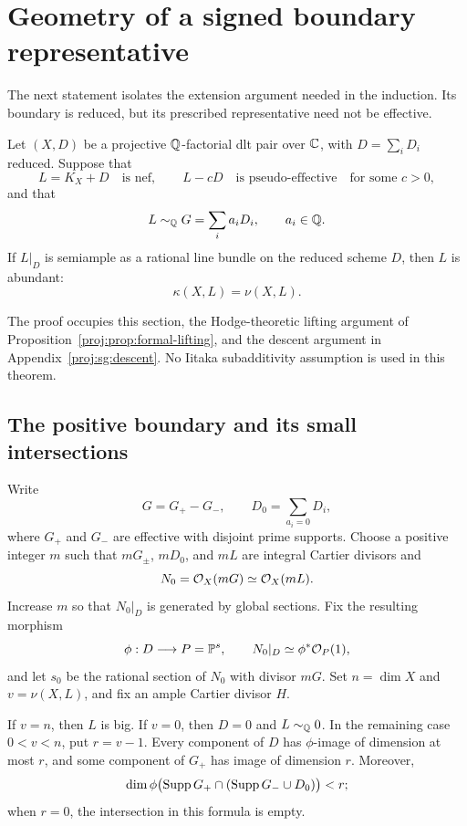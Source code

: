 \section{Geometry of a signed boundary representative}
\label{proj:sg:section}

The next statement isolates the extension argument needed in the
induction.  Its boundary is reduced, but its prescribed representative
need not be effective.

\begin{theorem}\label{proj:thm:signed}
Let $(X,D)$ be a projective $\mathbb{Q}$-factorial dlt pair over $\mathbb{C}$, with
$D=\sum_iD_i$ reduced.  Suppose that
\[
 L=K_X+D\quad\text{is nef},\qquad L-cD\quad\text{is pseudo-effective}
 \quad\text{for some }c>0,
\]
and that
\[
 L\sim_{\mathbb{Q}}G=\sum_i a_iD_i,\qquad a_i\in\mathbb{Q}.
\]
If $L|_D$ is semiample as a rational line bundle on the reduced scheme
$D$, then $L$ is abundant:
\[
 \kappa(X,L)=\nu(X,L).
\]
\end{theorem}

The proof occupies this section, the Hodge-theoretic lifting argument
of Proposition~\ref{proj:prop:formal-lifting}, and the descent argument in
Appendix~\ref{proj:sg:descent}.  No Iitaka subadditivity assumption is used
in this theorem.

\subsection{The positive boundary and its small intersections}

Write
\[
 G=G_+-G_-,\qquad D_0=\sum_{a_i=0}D_i,
\]
where $G_+$ and $G_-$ are effective with disjoint prime supports.
Choose a positive integer $m$ such that $mG_\pm$, $mD_0$, and $mL$
are integral Cartier divisors and
\[
 N_0=\mathcal{O}_X(mG)\simeq\mathcal{O}_X(mL).
\]
Increase $m$ so that $N_0|_D$ is generated by global sections.  Fix the
resulting morphism
\[
 \phi:D\longrightarrow P=\mathbb{P}^s,\qquad
 N_0|_D\simeq\phi^*\mathcal{O}_P(1),
\]
and let $s_0$ be the rational section of $N_0$ with divisor $mG$.
Set $n=\dim X$ and $v=\nu(X,L)$, and fix an ample Cartier divisor $H$.

\begin{lemma}\label{proj:sg:numerical-boundary}
If $v=n$, then $L$ is big.  If $v=0$, then $D=0$ and
$L\sim_{\mathbb{Q}}0$.  In the remaining case $0<v<n$, put $r=v-1$.
Every component of $D$ has $\phi$-image of dimension at most $r$,
and some component of $G_+$ has image of dimension $r$.
Moreover,
\[
 \dim\phi\bigl(\operatorname{Supp} G_+\cap(\operatorname{Supp} G_-\cup D_0)\bigr)<r;
\]
when $r=0$, the intersection in this formula is empty.
\end{lemma}

